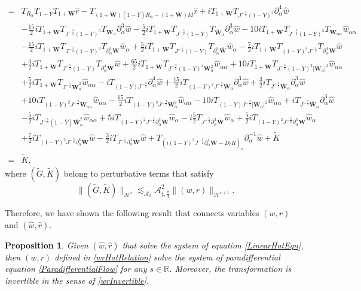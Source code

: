 \documentclass[10pt]{amsart}
\newtheorem{proposition}[theorem]{Proposition}
\theoremstyle{remark}
\theoremstyle{definition}
\numberwithin{equation}{section}
\newcommand{\p}{\partial}
\renewcommand{\H}{{\mathcal H }}
\newcommand{\al}{\alpha}
\newcommand{\f}{\frac}
\newcommand{\bw}{\mathbf{W}}
\newcommand{\CalAZ}{{\mathcal{A}_0}}
\newcommand{\ASSharp}{{\mathcal{A}_{\sharp,\frac{7}{4}}^2}}
\begin{document}
\begin{align*}
=& T_{R_\al} T_{1-\bar{Y}}T_{1+\bw} \hat{r} - T_{(1+\bw)(1-\bar{Y})R_\al-(1+\bw)M} \hat{r}  +iT_{1+\bw}T_{J^{-\f32}(1-Y)^2}\p^4_{\al}\hat{w}\\
&-\f{15}{2}iT_{1+\bw}T_{J^{-\f32}(1-Y)^3}T_{\bw_{\al}}\p^{3}_{\al}\hat{w}-\f52iT_{1+\bw}T_{J^{-\f52}(1-Y)}T_{\bar{\bw}_{\al}}\p^3_{\al}\hat{w}-10iT_{1+\bw}T_{J^{-\f32}(1-Y)^3}T_{\bw_{\al\al}}\hat{w}_{\al\al}\\
&-\f{15}{2}iT_{1+\bw}T_{J^{-\f32}(1-Y)^3}T_{\p^3_{\al}\bw}\hat{w}_{\al}+\f52 iT_{1+\bw}T_{J^{-\f52}(1-Y)}T_{\p^3_{\al}\bar{\bw}}
\hat{w}_{\al} -\f72iT_{1+\bw}T_{(1-Y)^3J^{-\f32}}T_{\p^4_{\al}\bw}\hat{w}\\
&+ \f32i T_{1+\bw}T_{J^{-\f52}(1-Y)}T_{\p^4_{\al}\bar{\bw}} \hat{w}+\f{65}{2}iT_{1+\bw}T_{J^{-\f32}(1-Y)^4\bw_{\al}^2}\hat{w}_{\al\al}+10iT_{1+\bw}T_{J^{-\f52}(1-Y)^2|\bw_{\al}|^2}\hat{w}_{\al\al}\\
&+\f{5}{2}iT_{1+\bw}T_{J^{-\f72}\bar{\bw}_{\al}^2}\hat{w}_{\al\al}-i T_{(1-Y)J^{-\f32}}\p_{\al}^4 \hat{w} + \f{15}{2}  i T_{(1-Y)^2J^{-\f32}\bw_\al}\p_{\al}^3 \hat{w}  + \f32  i T_{J^{-\f52}\bar{\bw}_\al}\p_{\al}^3 \hat{w}  \\
&+10i T_{(1-Y)^2J^{-\f32}\mathbf{W}_{\al\al}} \hat{w}_{\al \al} -\f{65}{2}iT_{(1-Y)^3J^{-\f32}\bw_\al^2} \hat{w}_{\al \al} - 10iT_{(1-Y)J^{-\f52}|\bw_\al|^2}\hat{w}_{\al \al} +i T_{J^{-\f52}\bar{\bw}_{\al}} \p_\al^3\hat{w} \\
&- \f52i T_{J^{-\f52}(1-\bar{Y}) \bar{\bw}_{\al}^2} \hat{w}_{\al \al} +5i  T_{(1-Y)^2J^{-\f32}\p_\al^3\mathbf{W}}\hat{w}_{\al}  -i\f52 T_{J^{-\f52}\p_\al^3\bar{\mathbf{W}}}\hat{w}_{\al}   +\f52 i T_{(1-Y)^2J^{-\f32}\p^3_{\al}\mathbf{W}}\hat{w}_\al \\
&+\f72 i T_{(1-Y)^2J^{-\f32}\p^4_{\al}\mathbf{W}}\hat{w}  -\f32 i T_{J^{-\f52}\p^4_{\al}\bar{\mathbf{W}}}\hat{w} +  T_{(i(1-Y)^2J^{-\f32}\p^4_{\al}\mathbf{W} -D_t R)_\al}\p_\al^{-1} \hat{w} + \tilde{K} \\
=& \tilde{K} ,
\end{align*}
where $(\tilde{G}, \tilde{K})$ belong to perturbative terms that satisfy 
\begin{equation*}
 \|(\tilde{G}, \tilde{K})\|_{\H^{s}} \lesssim_\CalAZ \ASSharp \|(w,r)\|_{\H^{s+1}}.
\end{equation*}

Therefore, we have shown the following result that connects variables $(w,r)$ and $(\hat{w}, \hat{r})$.

\begin{proposition} \label{t:HatwrHsWellposed}
Given $(\hat{w}, \hat{r})$ that solve the system of equation \eqref{LinearHatEqn}, then $(w,r)$ defined in \eqref{wrHatRelation} 
 solve the system of paradifferential equation \eqref{ParadifferentialFlow} for any $s\in \mathbb{R}$.
Moreover, the transformation is invertible in the sense of \eqref{wrInvertible}.
\end{proposition}
\end{document}

